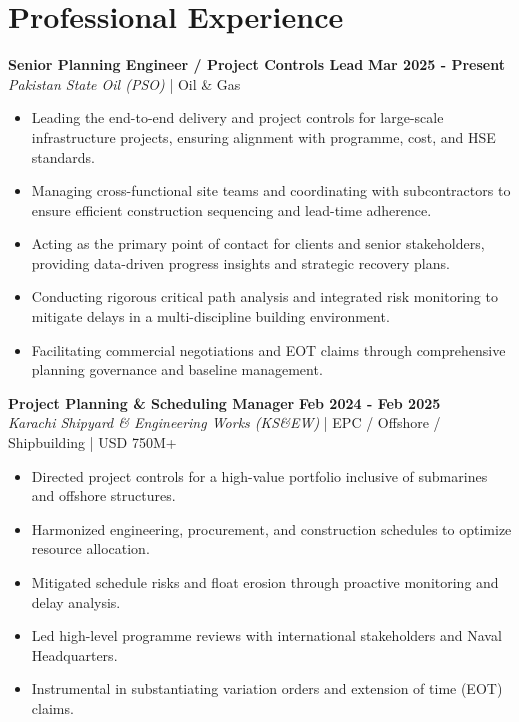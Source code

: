 \documentclass[11pt,a4paper]{article}
\begin{document}
\section{Professional Experience}
\noindent \textbf{\large Senior Planning Engineer / Project Controls Lead} \hfill \textbf{\color{awesome-blue}Mar 2025 - Present}\\
\textit{Pakistan State Oil (PSO)} | Oil \& Gas\\
\begin{itemize}
    \item Leading the end-to-end delivery and project controls for large-scale infrastructure projects, ensuring alignment with programme, cost, and HSE standards.
    \item Managing cross-functional site teams and coordinating with subcontractors to ensure efficient construction sequencing and lead-time adherence.
    \item Acting as the primary point of contact for clients and senior stakeholders, providing data-driven progress insights and strategic recovery plans.
    \item Conducting rigorous critical path analysis and integrated risk monitoring to mitigate delays in a multi-discipline building environment.
    \item Facilitating commercial negotiations and EOT claims through comprehensive planning governance and baseline management.
\end{itemize}

\noindent \textbf{\large Project Planning \& Scheduling Manager} \hfill \textbf{\color{awesome-blue}Feb 2024 - Feb 2025}\\
\textit{Karachi Shipyard \& Engineering Works (KS\&EW)} | EPC / Offshore / Shipbuilding | USD 750M+\\
\begin{itemize}
    \item Directed project controls for a high-value portfolio inclusive of submarines and offshore structures.
    \item Harmonized engineering, procurement, and construction schedules to optimize resource allocation.
    \item Mitigated schedule risks and float erosion through proactive monitoring and delay analysis.
    \item Led high-level programme reviews with international stakeholders and Naval Headquarters.
    \item Instrumental in substantiating variation orders and extension of time (EOT) claims.
\end{itemize}
\end{document}
